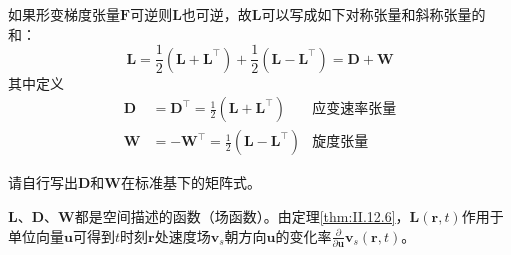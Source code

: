 \documentclass[main.tex]{subfiles}
\begin{document}
如果形变梯度张量$\mathbf{F}$可逆则$\mathbf{L}$也可逆，故$\mathbf{L}$可以写成如下对称张量和斜称张量的和：
\[\mathbf{L}=\frac{1}{2}\left(\mathbf{L}+\mathbf{L}^\intercal\right)+\frac{1}{2}\left(\mathbf{L}-\mathbf{L}^\intercal\right)=\mathbf{D}+\mathbf{W}\]
其中定义
\begin{align*}
    \mathbf{D}&=\mathbf{D}^\intercal=\frac{1}{2}\left(\mathbf{L}+\mathbf{L}^\intercal\right)&\text{应变速率张量}\\
    \mathbf{W}&=-\mathbf{W}^\intercal=\frac{1}{2}\left(\mathbf{L}-\mathbf{L}^\intercal\right)&\text{旋度张量}
\end{align*}

\begin{example}
请自行写出$\mathbf{D}$和$\mathbf{W}$在标准基下的矩阵式。
\end{example}

$\mathbf{L}$、$\mathbf{D}$、$\mathbf{W}$都是空间描述的函数（场函数）。由定理\ref{thm:II.12.6}，$\mathbf{L}\left(\mathbf{r},t\right)$作用于单位向量$\mathbf{u}$可得到$t$时刻$\mathbf{r}$处速度场$\mathbf{v}_s$朝方向$\mathbf{u}$的变化率$\frac{\partial }{\partial \mathbf{u}}\mathbf{v}_s\left(\mathbf{r},t\right)$。
\end{document}

